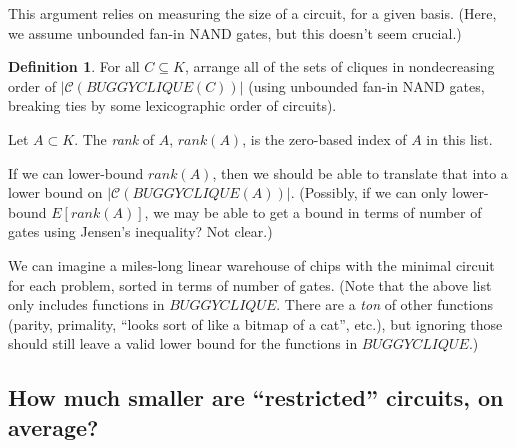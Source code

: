 \documentclass[12pt]{article}
\theoremstyle{definition}
\newtheorem{defn}{Definition}[section]
\newcommand{\bigC}[0]{\mathcal{C}}
\begin{document}
This argument relies on measuring the size of a circuit,
for a given basis. (Here, we assume unbounded fan-in
NAND gates, but this doesn't seem crucial.)

\begin{defn}
\label{Rank}
For all $C \subseteq K$,
arrange all of the sets of cliques in nondecreasing order
of $|\bigC(BUGGYCLIQUE(C))|$ (using unbounded fan-in NAND gates,
breaking ties by some lexicographic order of circuits).

Let $A \subset K$. The {\em rank} of $A$, $rank(A)$, is the zero-based
index of $A$ in this list.
\end{defn}

If we can lower-bound $rank(A)$, then we should be able to translate
that into a
lower bound on $|\bigC(BUGGYCLIQUE(A))|$. (Possibly, if we
can only lower-bound $E[rank(A)]$, we may be able to get
a bound in terms of number of gates using Jensen's inequality?
Not clear.)

We can imagine a miles-long linear warehouse of chips with the minimal
circuit for each problem, sorted in terms of number of gates.
(Note that the above list only includes functions in $BUGGYCLIQUE$.
There are a {\em ton} of other functions (parity, primality, ``looks
sort of like a bitmap of a cat'', etc.), but ignoring
those should still leave a valid lower bound for the functions in $BUGGYCLIQUE$.)

\subsection{How much smaller are ``restricted'' circuits, on average?}
\end{document}
